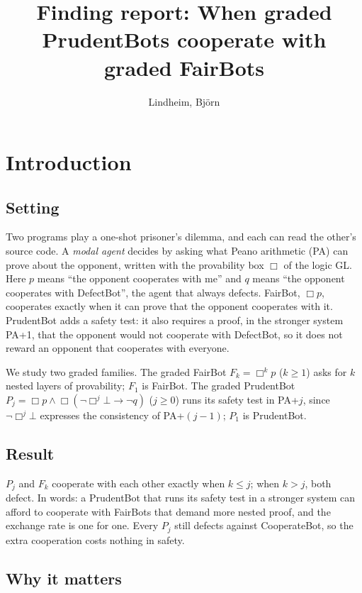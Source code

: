 \documentclass{article}
\title{Finding report: When graded PrudentBots cooperate with graded FairBots}
\author{Lindheim, Björn}
\date{}
\begin{document}
\maketitle
\section{Introduction}
\label{sec:graded-prudent-fair}

\subsection*{Setting}

Two programs play a one-shot prisoner's dilemma, and each can read the other's source code. A
\emph{modal agent} \cite{barasz2014robust} decides by asking what Peano arithmetic (PA) can prove about
the opponent, written with the provability box $\Box$ of the logic GL. Here $p$ means ``the
opponent cooperates with me'' and $q$ means ``the opponent cooperates with DefectBot'', the agent
that always defects. FairBot, $\Box p$, cooperates exactly when it can prove that the opponent
cooperates with it. PrudentBot adds a safety test: it also requires a proof, in the stronger
system PA+1, that the opponent would not cooperate with DefectBot, so it does not reward an
opponent that cooperates with everyone.

We study two graded families. The graded FairBot $F_k = \Box^k p$ ($k \ge 1$) asks for $k$
nested layers of provability; $F_1$ is FairBot. The graded PrudentBot
$P_j = \Box p \wedge \Box(\neg\Box^j\bot \rightarrow \neg q)$ ($j \ge 0$) runs its safety test
in PA+$j$, since $\neg\Box^{j}\bot$ expresses the consistency of PA+$(j-1)$; $P_1$ is
PrudentBot.

\subsection*{Result}

$P_j$ and $F_k$ cooperate with each other exactly when $k \le j$; when $k > j$, both defect.
In words: a PrudentBot that runs its safety test in a stronger system can afford to cooperate
with FairBots that demand more nested proof, and the exchange rate is one for one. Every $P_j$
still defects against CooperateBot, so the extra cooperation costs nothing in safety.

\subsection*{Why it matters}
\end{document}

